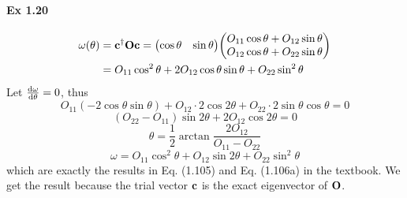 \documentclass[a4paper]{article}
\newcommand{\ex}[1]{\paragraph{Ex #1}}
\numberwithin{equation}{subsection}
\begin{document}
\ex{1.20}
\begin{equation}\label{key}
\begin{aligned}
\omega(\theta) &= \vb{c}^\dagger \vb{O} \vb{c} = \mqty(\cos\theta & \sin\theta) \mqty(O_{11}\cos\theta + O_{12}\sin\theta\\ O_{12}\cos\theta + O_{22}\sin\theta)\\
&= O_{11}\cos^2\theta + 2O_{12}\cos\theta\sin\theta + O_{22}\sin^2\theta\\
\end{aligned}
\end{equation}
Let $ \dv{\omega}{\theta} = 0 $, thus
\begin{equation}\label{key}
O_{11} (-2\cos\theta\sin\theta) + O_{12}\cdot 2\cos 2\theta + O_{22}\cdot 2\sin\theta\cos\theta = 0
\end{equation}
\begin{equation}\label{key}
(O_{22}-O_{11})\sin 2\theta + 2O_{12}\cos 2\theta = 0
\end{equation}
\begin{equation}\label{key}
\theta = \dfrac{1}{2}\arctan\dfrac{2O_{12}}{O_{11}-O_{22}}
\end{equation}
\begin{equation}\label{key}
\omega = O_{11}\cos^2\theta + O_{12}\sin 2\theta + O_{22}\sin^2\theta
\end{equation}
which are exactly the results in Eq. (1.105) and Eq. (1.106a) in the textbook. We get the result because the trial vector $ \vb{c} $ is the exact eigenvector of $ \vb{O} $.
\end{document}
